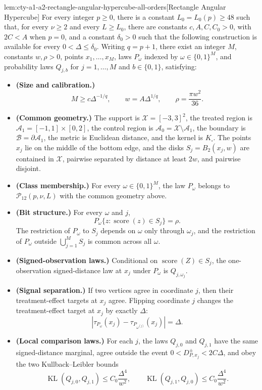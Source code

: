 \documentclass[11pt]{article}
\begin{document}
\begin{lemmav}{lem:cty-a1-a2-rectangle-angular-hypercube-all-orders}[Rectangle Angular Hypercube]
For every integer \(p\geq 0\), there is a constant \(L_0=L_0(p)\geq 48\) such that, for every \(\nu\geq 2\) and every \(L\geq L_0\), there are constants \(c,A,C,C_0>0\), with \(2C<A\) when \(p=0\), and a constant \(\delta_0>0\) such that the following construction is available for every \(0<\Delta\leq\delta_0\).  Writing \(q=p+1\), there exist an integer \(M\), constants \(w,\rho>0\), points \(x_1,\ldots,x_M\), laws \(P_\omega\) indexed by \(\omega\in\{0,1\}^M\), and probability laws \(Q_{j,b}\) for \(j=1,\ldots,M\) and \(b\in\{0,1\}\), satisfying:
\begin{itemize}
\item \textbf{(Size and calibration.)}
\[
M\geq c\Delta^{-1/q},\qquad
w=A\Delta^{1/q},\qquad
\rho=\frac{\pi w^2}{36}.
\]
\item \textbf{(Common geometry.)} The support is \(\mathcal X=[-3,3]^2\), the treated region is \(\mathcal A_1=[-1,1]\times[0,2]\), the control region is \(\mathcal A_0=\mathcal X\setminus\mathcal A_1\), the boundary is \(\mathcal B=\partial\mathcal A_1\), the metric is Euclidean distance, and the kernel is \(K_\square\).  The points \(x_j\) lie on the middle of the bottom edge, and the disks \(S_j=B_2(x_j,w)\) are contained in \(\mathcal X\), pairwise separated by distance at least \(2w\), and pairwise disjoint.
\item \textbf{(Class membership.)} For every \(\omega\in\{0,1\}^M\), the law \(P_\omega\) belongs to \(\mathcal P_{12}(p,\nu,L)\) with the common geometry above.
\item \textbf{(Bit structure.)} For every \(\omega\) and \(j\),
\[
P_\omega\{z:\operatorname{score}(z)\in S_j\}=\rho.
\]
The restriction of \(P_\omega\) to \(S_j\) depends on \(\omega\) only through \(\omega_j\), and the restriction of \(P_\omega\) outside \(\bigcup_{j=1}^M S_j\) is common across all \(\omega\).
\item \textbf{(Signed-observation laws.)} Conditional on \(\operatorname{score}(Z)\in S_j\), the one-observation signed-distance law at \(x_j\) under \(P_\omega\) is \(Q_{j,\omega_j}\).
\item \textbf{(Signal separation.)} If two vertices agree in coordinate \(j\), then their treatment-effect targets at \(x_j\) agree.  Flipping coordinate \(j\) changes the treatment-effect target at \(x_j\) by exactly \(\Delta\):
\[
\left|\tau_{P_\omega}(x_j)-\tau_{P_{\omega^{(j)}}}(x_j)\right|=\Delta.
\]
\item \textbf{(Local comparison laws.)} For each \(j\), the laws \(Q_{j,0}\) and \(Q_{j,1}\) have the same signed-distance marginal, agree outside the event \(0<D^\pm_{P,x_j}<2C\Delta\), and obey the two Kullback--Leibler bounds
\[
\operatorname{KL}(Q_{j,0},Q_{j,1})\leq C_0\frac{\Delta^4}{w^2},
\qquad
\operatorname{KL}(Q_{j,1},Q_{j,0})\leq C_0\frac{\Delta^4}{w^2}.
\]
\end{itemize}
\end{lemmav}
\end{document}
